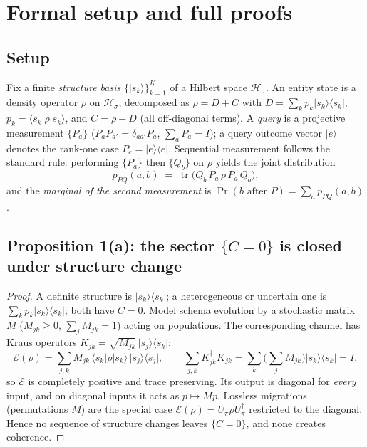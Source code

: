 \documentclass[11pt]{article}
\newcommand{\ket}[1]{\lvert #1 \rangle}
\newcommand{\bra}[1]{\langle #1 \rvert}
\newcommand{\tr}{\operatorname{tr}}
\theoremstyle{definition}
\begin{document}
\section{Formal setup and full proofs}

\subsection{Setup}
Fix a finite \emph{structure basis} $\{\ket{s_k}\}_{k=1}^K$ of a Hilbert space $\mathcal H_\sigma$. An entity state is a density operator $\rho$ on $\mathcal H_\sigma$, decomposed as $\rho = D + C$ with $D=\sum_k p_k \ket{s_k}\bra{s_k}$, $p_k = \bra{s_k}\rho\ket{s_k}$, and $C=\rho-D$ (all off-diagonal terms). A \emph{query} is a projective measurement $\{P_a\}$ ($P_aP_{a'}=\delta_{aa'}P_a$, $\sum_a P_a=I$); a query outcome vector $\ket e$ denotes the rank-one case $P_e=\ket e\bra e$. Sequential measurement follows the standard rule: performing $\{P_a\}$ then $\{Q_b\}$ on $\rho$ yields the joint distribution
\begin{equation}\label{eq:seq}
p_{PQ}(a,b) \;=\; \tr\!\big(Q_b\,P_a\,\rho\,P_a\,Q_b\big),
\end{equation}
and the \emph{marginal of the second measurement} is $\Pr(b \text{ after } P)=\sum_a p_{PQ}(a,b)$.

\subsection{Proposition 1(a): the sector $\{C=0\}$ is closed under structure change}
\begin{proof}
A definite structure is $\ket{s_k}\bra{s_k}$; a heterogeneous or uncertain one is $\sum_k p_k\ket{s_k}\bra{s_k}$; both have $C=0$. Model schema evolution by a stochastic matrix $M$ ($M_{jk}\ge0$, $\sum_j M_{jk}=1$) acting on populations. The corresponding channel has Kraus operators $K_{jk}=\sqrt{M_{jk}}\,\ket{s_j}\bra{s_k}$:
\[
\mathcal E(\rho)=\sum_{j,k}M_{jk}\,\bra{s_k}\rho\ket{s_k}\,\ket{s_j}\bra{s_j},
\qquad
\sum_{j,k}K_{jk}^\dagger K_{jk}=\sum_k\Big(\sum_j M_{jk}\Big)\ket{s_k}\bra{s_k}=I,
\]
so $\mathcal E$ is completely positive and trace preserving. Its output is diagonal for \emph{every} input, and on diagonal inputs it acts as $p\mapsto Mp$. Lossless migrations (permutations $M$) are the special case $\mathcal E(\rho)=U_\pi\rho U_\pi^\dagger$ restricted to the diagonal. Hence no sequence of structure changes leaves $\{C=0\}$, and none creates coherence.
\end{proof}
\end{document}
